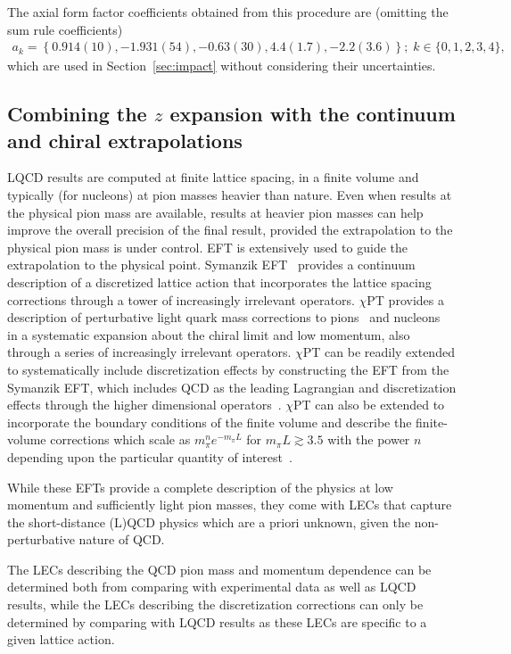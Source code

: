 \documentclass{ar-1col}
\begin{document}
The axial form factor coefficients obtained from this procedure are
 (omitting the sum rule coefficients)
\begin{align}
 a_k = \left\{ 0.914(10), -1.931(54), -0.63(30), 4.4(1.7), -2.2(3.6) \right\};
 \; k \in \{0,1,2,3,4\},
\end{align}
which are used in Section~\ref{sec:impact} without considering their uncertainties.

\subsection{Combining the $z$ expansion with the continuum and chiral extrapolations\label{sec:z_continuum}}

LQCD results are computed at finite lattice spacing, in a finite volume and typically (for nucleons) at pion masses heavier than nature.
Even when results at the physical pion mass are available, results at heavier pion masses can help improve the overall precision of the final result, provided the extrapolation to the physical pion mass is under control.
EFT is extensively used to guide the extrapolation to the physical point.
Symanzik EFT~\cite{Symanzik:1983dc,Symanzik:1983gh} provides a continuum description of a discretized lattice action that incorporates the lattice spacing corrections through a tower of increasingly irrelevant operators.
$\chi$PT provides a description of perturbative light quark mass corrections to pions~\cite{Gasser:1984gg} and nucleons~\cite{Jenkins:1990jv,Bernard:1995dp} in a systematic expansion about the chiral limit and low momentum, also through a series of increasingly irrelevant operators.
$\chi$PT can be readily extended to systematically include discretization effects by constructing the EFT from the Symanzik EFT, which includes QCD as the leading Lagrangian and discretization effects through the higher dimensional operators~\cite{Sharpe:1998xm}.
$\chi$PT can also be extended to incorporate the boundary conditions of the finite volume and describe the finite-volume corrections which scale as $m_\pi^n e^{-m_\pi L}$ for $m_\pi L \gtrsim3.5$ with the power $n$ depending upon the particular quantity of interest~\cite{Gasser:1986vb}.

While these EFTs provide a complete description of the physics at low momentum and sufficiently light pion masses, they come with LECs that capture the short-distance (L)QCD physics which are a priori unknown, given the non-perturbative nature of QCD.%
\begin{marginnote}
\end{marginnote}%
The LECs describing the QCD pion mass and momentum dependence can be determined both from comparing with experimental data as well as LQCD results, while the LECs describing the discretization corrections can only be determined by comparing with LQCD results as these LECs are specific to a given lattice action.
\end{document}
